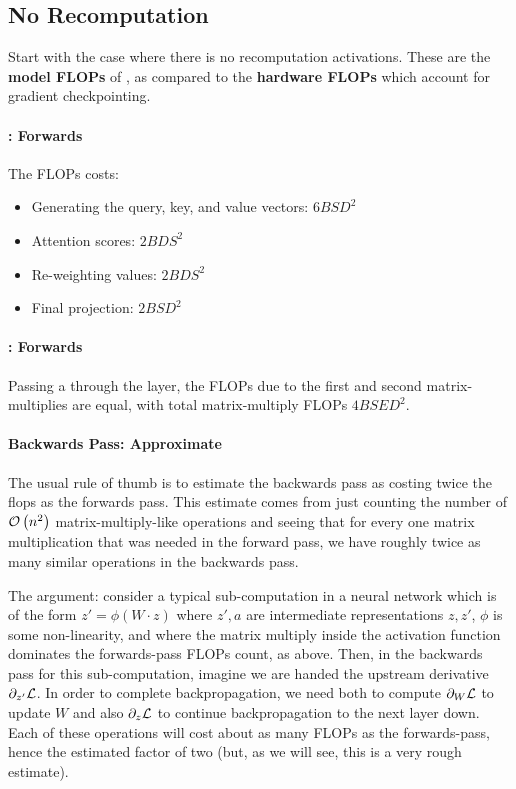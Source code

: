 \documentclass[11pt]{article}
\begin{document}
\subsection{No Recomputation}

Start with the case where there is no recomputation activations.  These are the \textbf{model FLOPs} of
\cite{korthikanti2022reducing}, as compared to the \textbf{hardware FLOPs} which account for gradient
checkpointing.


\paragraph{: Forwards }

The FLOPs costs:
\begin{itemize}
	\item  Generating the query, key, and value vectors: $ 6BSD ^{ 2 } $
	\item Attention scores:  $2BDS ^{ 2 }$
	\item Re-weighting values:  $2BDS ^{ 2 }$
	\item Final projection: $ 2BSD ^{ 2 } $
\end{itemize}

\paragraph{: Forwards}
Passing a  through the  layer, the FLOPs due to the
first and second matrix-multiplies are equal, with total matrix-multiply FLOPs  $ 4BSED ^{ 2 } $.

\paragraph{Backwards Pass: Approximate}


The usual rule of thumb is to estimate the backwards pass as costing twice the flops as the forwards
pass. This estimate comes from just counting the number of $ \mathcal{O} \left( n ^{ 2 } \right)$
matrix-multiply-like operations and seeing that for every one matrix multiplication that was needed
in the forward pass, we have roughly twice as many similar operations in the backwards pass.


The argument: consider a typical sub-computation in a neural network which is of the form $ z' =
	\phi \left ( W \cdot z \right ) $ where $ z', a $ are intermediate representations $ z, z' $, $ \phi
$ is some non-linearity, and where the matrix multiply inside the activation function dominates the
forwards-pass FLOPs count, as above.  Then, in the backwards pass for this sub-computation, imagine
we are handed the upstream derivative $ \partial _{ z '  } \mathcal{L} $. In order to complete
backpropagation, we need both to compute $ \partial  _{ W }\mathcal{L}  $ to update $ W $ and also $
	\partial  _{ z } \mathcal{L}  $ to continue backpropagation to the next layer down. Each of these operations
will cost about as many FLOPs as the forwards-pass, hence the estimated factor of two (but, as
we will see, this is a very rough estimate).
\end{document}
